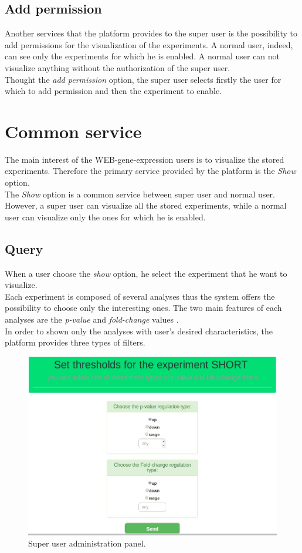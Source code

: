 \documentclass[a4paper]{report}
\begin{document}
\subsection{Add permission}
Another services that the platform provides to the super user  is the possibility to add permissions for the visualization of the experiments. A normal user, indeed, can see only the experiments for which he is enabled. A normal user can not visualize anything without the authorization of the super user.\\
Thought the \emph{add permission} option, the super user selects firstly the user for which to add permission and then the experiment to enable.

\section{Common service}
The main interest of the WEB-gene-expression users is to visualize the stored experiments. Therefore the primary service provided by the platform is the \emph{Show} option.\\
The 	\emph{Show} option is a common service between super user and normal user. However, a super user can visualize all the stored experiments, while a normal user can visualize only the ones for which he is enabled.

\subsection{Query}
When a user choose the \emph{show} option, he select the experiment that he want to visualize.\\
Each experiment is composed of several analyses thus the system offers the possibility to choose only the interesting ones. The two main features of each analyses are the \emph{p-value} and \emph{fold-change} values .\\
In order to shown only the analyses with user's desired characteristics, the platform provides three types of filters.

\begin{figure}[htb] 
\begin{center}
\includegraphics[scale=0.4]{figure/filters.jpg} 
\end{center}
\caption{Super user administration panel.}
\label{filters}
\end{figure}
\end{document}
